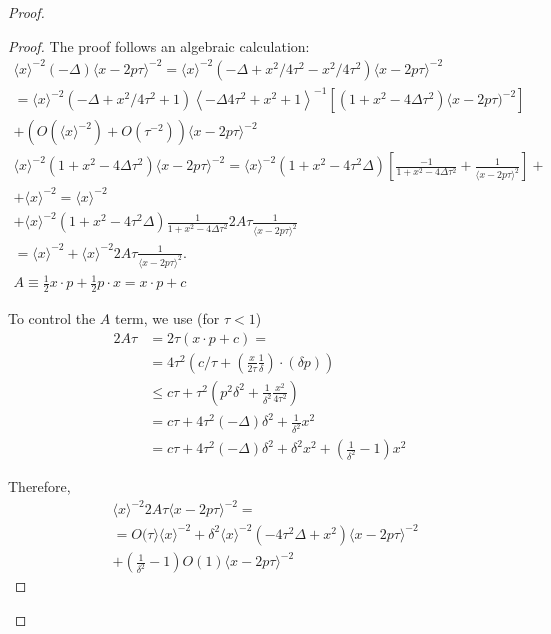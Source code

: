 \documentclass[11pt]{article}
\begin{document}
\begin{proof}
\begin{proof}
The proof follows an algebraic calculation:
$$
\begin{gathered}
\langle x\rangle^{-2}(-\Delta)\langle x-2 p \tau\rangle^{-2}=\langle x\rangle^{-2}\left(-\Delta+x^{2} / 4 \tau^{2}-x^{2} / 4 \tau^{2}\right)\langle x-2 p \tau\rangle^{-2} \\
=\langle x\rangle^{-2}\left(-\Delta+x^{2} / 4 \tau^{2}+1\right)\left\langle-\Delta 4 \tau^{2}+x^{2}+1\right\rangle^{-1}\left[\left(1+x^{2}-4 \Delta \tau^{2}\right)\langle x-2 p \tau)^{-2}\right] \\
+\left(O\left(\langle x\rangle^{-2}\right)+O\left(\tau^{-2}\right)\right)\langle x-2 p \tau\rangle^{-2} 
\end{gathered}$$
$$
\begin{gathered}
\langle x\rangle^{-2}\left(1+x^{2}-4 \Delta \tau^{2}\right)\langle x-2 p \tau\rangle^{-2}=\langle x \rangle^{-2}\left(1+x^{2}-4 \tau^{2} \Delta\right)\left[\frac{-1}{1+x^{2}-4 \Delta \tau^ 2}+\frac{1}{\langle x-2 p\tau\rangle ^{2}}\right]+ \\
+\langle x\rangle^{-2}=\langle x\rangle^{-2} \\
+\langle x\rangle^{-2}\left(1+x^{2}-4 \tau^{2} \Delta\right) \frac{1}{1+x^{2}-4 \Delta \tau^2} 2 A \tau \frac{1}{\langle x-2 p \tau\rangle^{2}} \\
=\langle x\rangle^{-2}+\langle x\rangle^{-2} 2 A \tau \frac{1}{\langle x-2 p \tau\rangle^{2}}.\\
A \equiv \frac{1}{2} x \cdot p+\frac{1}{2} p \cdot x=x \cdot p+c
\end{gathered}
$$


To control the $A$ term, we use (for $\tau <1$)
$$
\begin{aligned}
2 A \tau & =2 \tau(x \cdot p+c)= \\
& =4 \tau^{2}\left(c / \tau+\left(\frac{x}{2 \tau} \frac{1}{\delta}\right) \cdot(\delta p)\right) \\
& \leqslant c \tau+ \tau^{2}\left(p^{2} \delta^{2}+\frac{1}{\delta^{2}} \frac{x^{2}}{4 \tau^{2}}\right) \\
& =c \tau+4 \tau^{2}(-\Delta) \delta^{2}+\frac{1}{\delta^{2}} x^{2} \\
& =c \tau+4 \tau^{2}(-\Delta) \delta^{2}+\delta^{2} x^{2}+\left(\frac{1}{\delta^{2}}-1\right) x^{2}
\end{aligned}
$$

Therefore,
$$
\begin{aligned}
& \langle x\rangle^{-2} 2 A \tau\langle x-2 p \tau\rangle^{-2}= \\
& =O(\tau\rangle\langle x\rangle^{-2}+\delta^{2}\langle x\rangle^{-2}\left(-4 \tau^{2} \Delta+x^{2}\right)\langle x-2 p \tau\rangle^{-2} \\
& +\left(\frac{1}{\delta^{2}}-1\right) O(1)\langle x-2 p \tau\rangle^{-2}
\end{aligned}
$$


\end{proof}
\end{proof}
\end{document}
